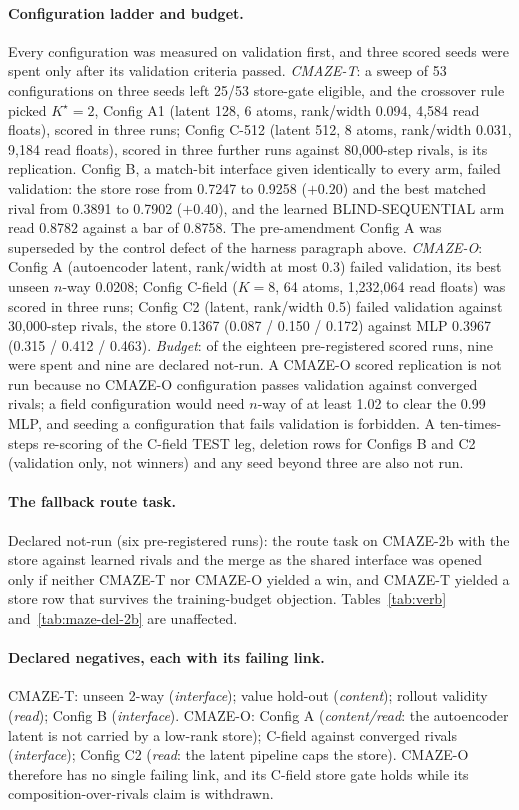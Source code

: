 \documentclass{article} %
\newcommand{\Kstar}{\ensuremath{K^{\star}}}
\begin{document}
\paragraph{Configuration ladder and budget.} Every configuration was measured on validation first,
and three scored seeds were spent only after its validation criteria passed. \emph{CMAZE-T}: a sweep of
53 configurations on three seeds left 25/53 store-gate eligible, and the crossover rule picked
$\Kstar=2$, Config A1 (latent 128, 6 atoms, rank/width 0.094, 4,584 read floats), scored in three
runs; Config C-512 (latent 512, 8 atoms, rank/width 0.031, 9,184 read floats), scored in three further
runs against 80,000-step rivals, is its replication. Config B, a match-bit interface given identically to
every arm, failed validation: the store rose from 0.7247 to 0.9258 ($+0.20$) and the best matched
rival from 0.3891 to 0.7902 ($+0.40$), and the learned BLIND-SEQUENTIAL arm read 0.8782 against a bar
of 0.8758. The pre-amendment Config A was superseded by the control defect of the harness paragraph
above. \emph{CMAZE-O}: Config A (autoencoder latent, rank/width at most 0.3) failed validation, its
best unseen $n$-way 0.0208; Config C-field ($K=8$, 64 atoms, 1,232,064 read floats) was scored in
three runs; Config C2 (latent, rank/width 0.5) failed validation against 30,000-step rivals, the store
0.1367 (0.087 / 0.150 / 0.172) against MLP 0.3967 (0.315 / 0.412 / 0.463). \emph{Budget}: of the eighteen
pre-registered scored runs, nine were spent and nine are declared not-run. A CMAZE-O scored
replication is not run because no CMAZE-O
configuration passes validation against converged rivals; a field configuration would need $n$-way
of at least 1.02 to clear the 0.99 MLP, and seeding a configuration that fails validation is
forbidden. A ten-times-steps re-scoring of the C-field TEST leg, deletion rows for Configs B and C2
(validation only, not winners) and any seed beyond three are also not run.
\paragraph{The fallback route task.} Declared not-run (six pre-registered runs): the route task on CMAZE-2b %
with the store against learned rivals and the merge as the shared interface was opened only if
neither CMAZE-T nor CMAZE-O yielded a win, and CMAZE-T yielded a store row that survives the
training-budget objection. Tables~\ref{tab:verb} and~\ref{tab:maze-del-2b} are unaffected.
\paragraph{Declared negatives, each with its failing link.} CMAZE-T: unseen 2-way
(\emph{interface}); value hold-out (\emph{content}); rollout validity (\emph{read}); Config B
(\emph{interface}). CMAZE-O: Config A (\emph{content/read}: the autoencoder latent is not carried by
a low-rank store); C-field against converged rivals (\emph{interface}); Config C2 (\emph{read}: the
latent pipeline caps the store). CMAZE-O therefore has no single failing link, and its C-field
store gate holds while its composition-over-rivals claim is withdrawn.
\end{document}
